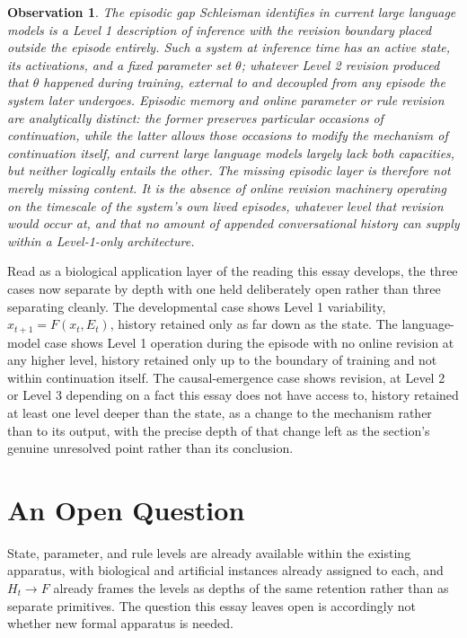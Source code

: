 \documentclass[11pt]{article}
\newtheorem{observation}{Observation}[section]
\begin{document}
\begin{observation}
The episodic gap Schleisman identifies in current large language models is a Level 1 description of inference with the revision boundary placed outside the episode entirely. Such a system at inference time has an active state, its activations, and a fixed parameter set $\theta$; whatever Level 2 revision produced that $\theta$ happened during training, external to and decoupled from any episode the system later undergoes. Episodic memory and online parameter or rule revision are analytically distinct: the former preserves particular occasions of continuation, while the latter allows those occasions to modify the mechanism of continuation itself, and current large language models largely lack both capacities, but neither logically entails the other. The missing episodic layer is therefore not merely missing content. It is the absence of online revision machinery operating on the timescale of the system's own lived episodes, whatever level that revision would occur at, and that no amount of appended conversational history can supply within a Level-1-only architecture.
\end{observation}

Read as a biological application layer of the reading this essay develops, the three cases now separate by depth with one held deliberately open rather than three separating cleanly. The developmental case shows Level 1 variability, $x_{t+1} = F(x_t, E_t)$, history retained only as far down as the state. The language-model case shows Level 1 operation during the episode with no online revision at any higher level, history retained only up to the boundary of training and not within continuation itself. The causal-emergence case shows revision, at Level 2 or Level 3 depending on a fact this essay does not have access to, history retained at least one level deeper than the state, as a change to the mechanism rather than to its output, with the precise depth of that change left as the section's genuine unresolved point rather than its conclusion.

\section{An Open Question}

State, parameter, and rule levels are already available within the existing apparatus, with biological and artificial instances already assigned to each, and $H_t \to F$ already frames the levels as depths of the same retention rather than as separate primitives. The question this essay leaves open is accordingly not whether new formal apparatus is needed.
\end{document}
